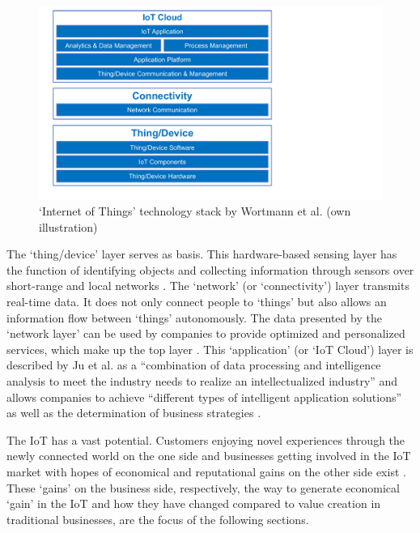 	\begin{figure}[!htb]
	    \begin{center}
	    \includegraphics[scale=0.5]{Talk11/wortmann_stack.pdf}
	    \end{center}
	    \caption{`Internet of Things' technology stack by Wortmann et al. \cite{wortmann} (own illustration)}
	    \label{fig:wortmann_stack}
    \end{figure}
	The `thing/device' layer serves as basis. This hardware-based sensing layer has the function of identifying objects and collecting information through sensors over short-range and local networks \cite{ju}. The `network' (or `connectivity') layer transmits real-time data. It does not only connect people to `things' but also allows an information flow between `things' autonomously. The data presented by the `network layer' can be used by companies to provide optimized and personalized services, which make up the top layer \cite{ju}. This `application' (or `IoT Cloud') layer is described by Ju et al. as a ``combination of data processing and intelligence analysis to meet the industry needs to realize an intellectualized industry'' \cite{ju} and allows companies to achieve ``different types of intelligent application solutions'' as well as the determination of business strategies \cite{ju}.

	The IoT has a vast potential. Customers enjoying novel experiences through the newly connected world on the one side and businesses getting involved in the IoT market with hopes of economical and reputational gains on the other side exist \cite{ju}. These `gains' on the business side, respectively, the way to generate economical `gain' in the IoT and how they have changed compared to value creation in traditional businesses, are the focus of the following sections.
	\vspace{-1em}
